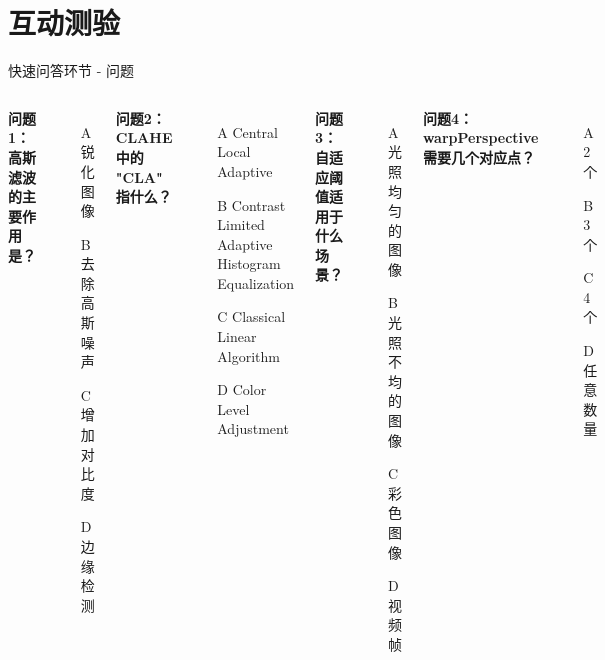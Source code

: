 
\section{互动测验}


\begin{frame}[fragile]{快速问答环节 - 问题}
    \begin{columns}
        \textbf{问题1：高斯滤波的主要作用是？}
        \begin{itemize}
            \item[A] 锐化图像
            \item[B] 去除高斯噪声
            \item[C] 增加对比度
            \item[D] 边缘检测
        \end{itemize}

        \vspace{0.3cm}
        \textbf{问题2：CLAHE 中的 "CLA" 指什么？}
        \begin{itemize}
            \item[A] Central Local Adaptive
            \item[B] Contrast Limited Adaptive Histogram Equalization
            \item[C] Classical Linear Algorithm
            \item[D] Color Level Adjustment
        \end{itemize}

        \textbf{问题3：自适应阈值适用于什么场景？}
        \begin{itemize}
            \item[A] 光照均匀的图像
            \item[B] 光照不均的图像
            \item[C] 彩色图像
            \item[D] 视频帧
        \end{itemize}

        \vspace{0.3cm}
        \textbf{问题4：warpPerspective 需要几个对应点？}
        \begin{itemize}
            \item[A] 2个
            \item[B] 3个
            \item[C] 4个
            \item[D] 任意数量
        \end{itemize}
    \end{columns}


\end{frame}
